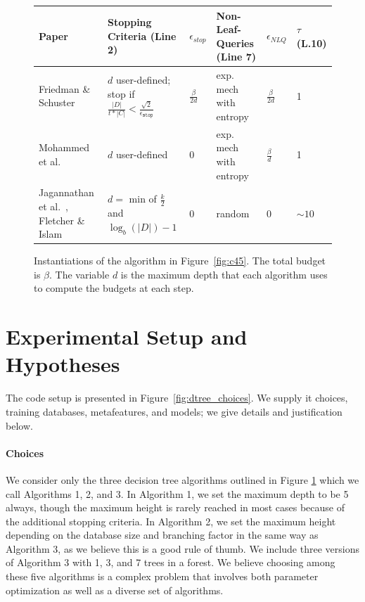 \documentclass[11pt]{report}
\renewcommand{\t}[1]{\texttt{#1}}
\begin{document}
\begin{figure}
\begin{center}
\begin{tabular}{|p{2cm}|p{3cm}|l|p{3cm}|l|p{1cm}|}
\hline
Paper & Stopping Criteria (Line 2) & $\epsilon_{stop}$ & Non-Leaf-Queries (Line 7) & $\epsilon_{NLQ}$ & $\tau$ (L.10) \\ \hline
Friedman \& Schuster~\cite{Friedman:2010} & $d$ user-defined; stop if $\frac{|D|}{t*|C|} < \frac{\sqrt{2}}{\epsilon_{\t{stop}}}$ & $\frac{\beta}{2d}$ & exp. mech with entropy& $\frac{\beta}{2d}$ & 1 \\ \hline
Mohammed et al.~\cite{Mohammed:2015} & $d$ user-defined & 0 & exp. mech with entropy & $\frac{\beta}{d}$ & 1 \\ \hline
Jagannathan et al.~\cite{Jagannathan:2009}, Fletcher \& Islam~\cite{Fletcher:2015} & $d=$ min of $\frac{k}{2}$ and $\log_b(|D|)-1$ & 0 & random & 0 & $\sim 10$ \\ \hline
\end{tabular}
\end{center}
\caption{Instantiations of the algorithm in Figure~\ref{fig:c45}. The total budget is $\beta$. The variable $d$ is the maximum depth that each algorithm uses to compute the budgets at each step.}\label{fig:algtable}
\end{figure}

\section{Experimental Setup and Hypotheses}

The code setup is presented in Figure~\ref{fig:dtree_choices}. We supply it choices, training databases, metafeatures, and models; we give details and justification below.
\paragraph{Choices} We consider only the three decision tree algorithms outlined in Figure \ref{fig:algtable} which we call Algorithms 1, 2, and 3. In Algorithm 1, we set the maximum depth to be 5 always, though the maximum height is rarely reached in most cases because of the additional stopping criteria. In Algorithm 2, we set the maximum height depending on the database size and branching factor in the same way as Algorithm 3, as we believe this is a good rule of thumb. We include three versions of Algorithm 3 with 1, 3, and 7 trees in a forest. We believe choosing among these five algorithms is a complex problem that involves both parameter optimization as well as a diverse set of algorithms.
\end{document}
